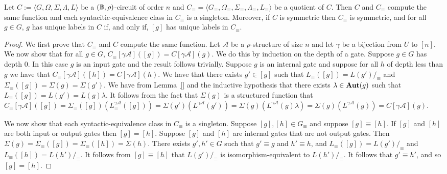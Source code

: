 \documentclass[../paper.tex]{subfiles}
\begin{document}
\begin{lem}
  Let $C := \langle G, \Omega, \Sigma, \Lambda, L\rangle$ be a $(\mathbb{B},
  \rho)$-circuit of order $n$ and $C_{\equiv} = \langle G_\equiv ,
  \Omega_\equiv, \Sigma_\equiv , \Lambda_\equiv, L_\equiv \rangle$ be a quotient
  of $C$. Then $C$ and $C_{\equiv}$ compute the same function and each
  syntacitic-equivalence class in $C_\equiv$ is a singleton. Moreover, if $C$ is
  symmetric then $C_{\equiv}$ is symmetric, and for all $g \in G$, $g$ has
  unique labels in $C$ if, and only if, $[g]$ has unique labels in $C_{\equiv}$.
  \label{lem:quotient-circuits-preserve}
\end{lem}
\begin{proof}
  We first prove that $C_\equiv$ and $C$ compute the same function. Let
  $\mathcal{A}$ be a $\rho$-structure of size $n$ and let $\gamma$ be a
  bijection from $U$ to $[n]$. We now show that for all $g \in G$, $C_\equiv
  [\gamma \mathcal{A}]([g]) = C[\gamma \mathcal{A}](g)$. We do this by induction
  on the depth of a gate. Suppose $g \in G$ has depth $0$. In this case $g$ is
  an input gate and the result follows trivially. Suppose $g$ is an internal
  gate and suppose for all $h$ of depth less than $g$ we have that
  $C_\equiv[\gamma \mathcal{A}]([h]) = C[\gamma \mathcal{A}](h)$. We have that
  there exists $g' \in [g]$ such that $L_\equiv ([g]) = L(g') /_\equiv$ and
  $\Sigma_\equiv([g]) = \Sigma (g) = \Sigma (g')$. We have from Lemma~\ref{} and
  the inductive hypothesis that there exists $\lambda \in \text{\textbf{Aut}}(g)$ such that
  $L_\equiv ([g]) = L(g') = L(g) \lambda$. It follows from the fact that
  $\Sigma(g)$ is a structured function that $C_\equiv[\gamma \mathcal{A}]([g]) =
  \Sigma_\equiv ([g])(L^{\gamma \mathcal{A}}_\equiv([g])) = \Sigma (g')
  (L^{\gamma \mathcal{A}}(g')) = \Sigma (g)(L^{\gamma \mathcal{A}}(g) \lambda) =
  \Sigma (g) (L^{\gamma \mathcal{A}}(g)) = C[\gamma \mathcal{A}](g)$.
  
  We now show that each syntactic-equivalence class in $C_\equiv$ is a
  singleton. Suppose $[g], [h] \in G_\equiv$ and suppose $[g] \equiv [h]$. If
  $[g]$ and $[h]$ are both input or output gates then $[g] = [h]$. Suppose $[g]$
  and $[h]$ are internal gates that are not output gates. Then $\Sigma (g) =
  \Sigma_\equiv ([g]) = \Sigma_\equiv([h]) = \Sigma(h)$. There exists $g', h'
  \in G$ such that $g' \equiv g$ and $h' \equiv h$, and $L_\equiv ([g]) = L(g')
  /_\equiv$ and $L_\equiv ([h]) = L(h') /_\equiv$. It follows from $[g] \equiv
  [h]$ that $L(g') /_\equiv$ is isomorphism-equivalent to $L(h') /_\equiv$. It
  follows that $g' \equiv h'$, and so $[g] = [h]$.


\end{proof}
\end{document}
